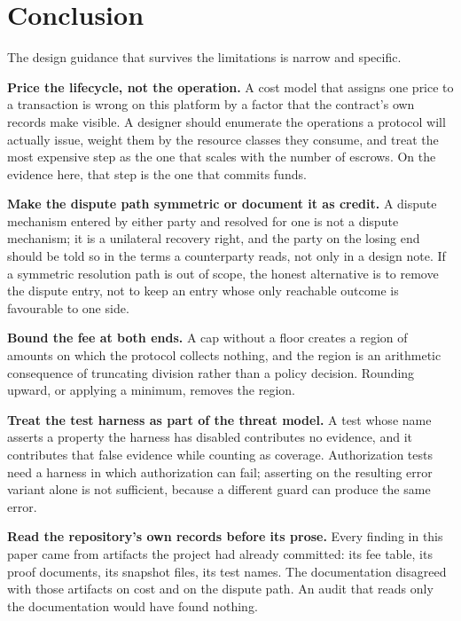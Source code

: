 \documentclass[sigconf,review]{acmart}
\begin{document}
\section{Conclusion}
\label{sec:conclusion}

The design guidance that survives the limitations is narrow and specific.

\textbf{Price the lifecycle, not the operation.} A cost model that assigns one
price to a transaction is wrong on this platform by a factor that the contract's
own records make visible. A designer should enumerate the operations a protocol
will actually issue, weight them by the resource classes they consume, and
treat the most expensive step as the one that scales with the number of
escrows. On the evidence here, that step is the one that commits funds.

\textbf{Make the dispute path symmetric or document it as credit.} A dispute
mechanism entered by either party and resolved for one is not a dispute
mechanism; it is a unilateral recovery right, and the party on the losing end
should be told so in the terms a counterparty reads, not only in a design note.
If a symmetric resolution path is out of scope, the honest alternative is to
remove the dispute entry, not to keep an entry whose only reachable outcome is
favourable to one side.

\textbf{Bound the fee at both ends.} A cap without a floor creates a region of
amounts on which the protocol collects nothing, and the region is an arithmetic
consequence of truncating division rather than a policy decision. Rounding
upward, or applying a minimum, removes the region.

\textbf{Treat the test harness as part of the threat model.} A test whose name
asserts a property the harness has disabled contributes no evidence, and it
contributes that false evidence while counting as coverage. Authorization tests
need a harness in which authorization can fail; asserting on the resulting error
variant alone is not sufficient, because a different guard can produce the same
error.

\textbf{Read the repository's own records before its prose.} Every finding in
this paper came from artifacts the project had already committed: its fee table,
its proof documents, its snapshot files, its test names. The documentation
disagreed with those artifacts on cost and on the dispute path. An audit that
reads only the documentation would have found nothing.
\end{document}
